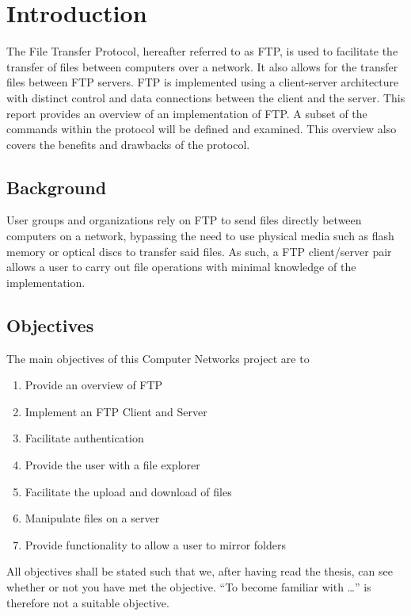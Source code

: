 \chapter{Introduction}
The File Transfer Protocol, hereafter referred to as FTP, is used to
facilitate the transfer of files between computers over a network. It also
allows for the transfer files between FTP servers.
FTP is implemented using a client-server architecture with distinct control
and data connections between the client and the server. This report provides an
overview of an implementation of FTP. A subset of the commands within the protocol
will be defined and examined. This overview also covers the benefits and drawbacks
of the protocol.


\section{Background}
User groups and organizations rely on FTP to send files directly between computers on a network,
bypassing the need to use physical media such as flash memory or optical discs to transfer said files.
As such, a FTP client/server pair allows a user to carry out file operations with minimal knowledge of the implementation.

\newpage

\section{Objectives}
The main objectives of this Computer Networks project are to
\begin{enumerate}
\item Provide an overview of FTP
\item Implement an FTP Client and Server
\item Facilitate authentication
\item Provide the user with a file explorer
\item Facilitate the upload and download of files
\item Manipulate files on a server
\item Provide functionality to allow a user to mirror folders
\end{enumerate}

All objectives shall be stated such that we, after having read the thesis, can see whether or not you have met the objective. ``To become familiar with \ldots'' is therefore not a suitable objective.


